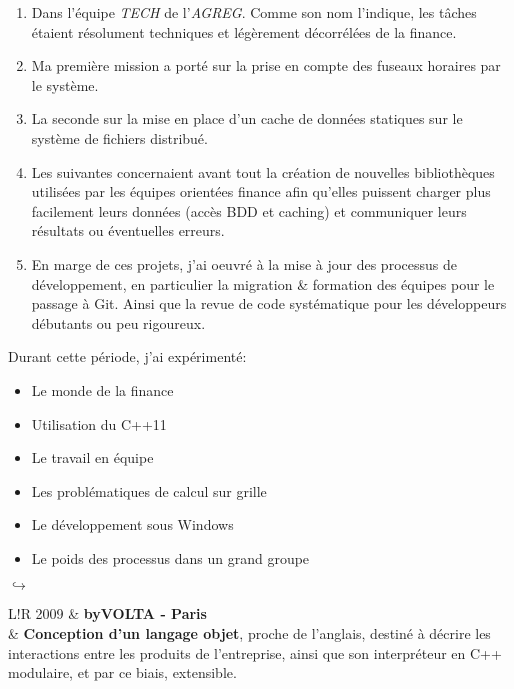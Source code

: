 \documentclass[10pt]{article}
\newcommand{\VRule}{{\color{lightgray}\vrule width 0.5pt}}
\begin{document}
\begin{enumerate}
\item Dans l'équipe \textit{TECH} de l'\textit{AGREG}.
  Comme son nom l'indique, les tâches étaient résolument techniques et
  légèrement décorrélées de la finance.

\item Ma première mission a porté sur la prise en compte des fuseaux
  horaires par le système.

\item La seconde sur la mise en place d'un cache de données statiques 
  sur le système de fichiers distribué.

\item Les suivantes concernaient avant tout la création de nouvelles
  bibliothèques utilisées par les équipes orientées finance
  afin qu'elles puissent charger plus facilement leurs données
  (accès BDD et caching) et communiquer leurs résultats ou éventuelles erreurs.

\item En marge de ces projets, j'ai oe{}uvré à la mise à jour des processus de
  développement, en particulier la migration \& formation des équipes
  pour le passage à Git.
  Ainsi que la revue de code systématique pour les développeurs débutants
  ou peu rigoureux.
\end{enumerate}

Durant cette période, j'ai expérimenté:
\begin{itemize}
\item Le monde de la finance
\item Utilisation du C++11
\item Le travail en équipe
\item Les problématiques de calcul sur grille
\item Le développement sous Windows
\item Le poids des processus dans un grand groupe
\end{itemize}

\clearpage

\begin{center}
$\hookrightarrow$
\end{center}

\begin{longtable}{L!{\VRule}R}
2009 & \textbf{byVOLTA - Paris}
\\
& \textbf{Conception d'un langage objet}, proche de l'anglais,
  destiné à décrire
  les interactions entre les produits de l'entreprise, ainsi que son
  interpréteur en C++ modulaire, et par ce biais, extensible.
\end{longtable}
\end{document}

